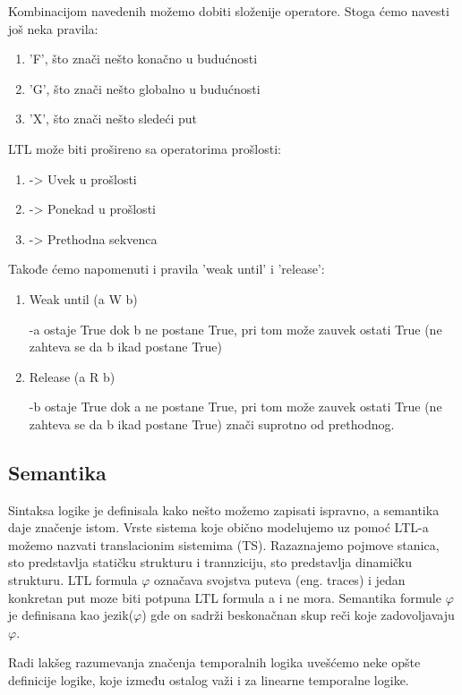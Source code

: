 \documentclass[a4paper]{article}
\begin{document}
{	Kombinacijom navedenih možemo dobiti složenije operatore. Stoga ćemo navesti još neka pravila:
\begin{enumerate}	
\item  'F', što znači nešto konačno u budućnosti 
\item  'G', što znači nešto globalno u budućnosti 
\item  'X', što znači nešto sledeći put 
\end{enumerate}
	LTL može biti prošireno sa operatorima prošlosti: 
\begin{enumerate}	
\item  -> Uvek u prošlosti 
\item  -> Ponekad u prošlosti 
\item  -> Prethodna sekvenca 
\end{enumerate}

Takođe ćemo napomenuti i pravila 'weak until' i 'release':
\begin{enumerate}	
\item  Weak until (a W b)

		-a ostaje True dok b ne postane True, pri tom može zauvek ostati True (ne zahteva se da b ikad postane True)
\item   Release (a R b) 

		-b ostaje True dok a ne postane True, pri tom može zauvek ostati True (ne zahteva se da b ikad postane True) znači suprotno od prethodnog.
\end{enumerate}		

	\subsection{Semantika}
	\label{subsec:podnaslovN}
	
	Sintaksa logike je definisala kako nešto možemo zapisati ispravno, a semantika daje značenje istom.
	Vrste sistema koje obično modelujemo uz pomoć LTL-a možemo nazvati translacionim sistemima (TS). Razaznajemo pojmove stanica, sto predstavlja statičku strukturu i trannziciju, sto predstavlja dinamičku strukturu.
	LTL formula $\varphi$ označava svojstva puteva (eng. traces) i jedan konkretan put moze biti potpuna LTL formula a i ne mora.
	Semantika formule $\varphi$ je definisana kao jezik($\varphi$) gde on sadrži beskonačnan skup reči koje zadovoljavaju $\varphi$.
	
	Radi lakšeg razumevanja značenja temporalnih logika uvešćemo neke opšte definicije logike, koje između ostalog važi i za linearne temporalne logike.

}
\end{document}
